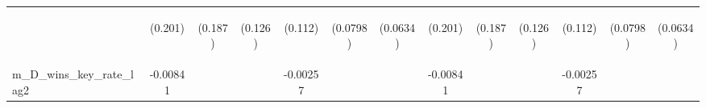 \documentclass[]{article}
\begin{document}
\begin{center}
\begin{tabular}{lcccccccccccc}
\vspace{4pt} & \begin{footnotesize}(0.201)\end{footnotesize} & \begin{footnotesize}(0.187)\end{footnotesize} & \begin{footnotesize}(0.126)\end{footnotesize} & \begin{footnotesize}(0.112)\end{footnotesize} & \begin{footnotesize}(0.0798)\end{footnotesize} & \begin{footnotesize}(0.0634)\end{footnotesize} & \begin{footnotesize}(0.201)\end{footnotesize} & \begin{footnotesize}(0.187)\end{footnotesize} & \begin{footnotesize}(0.126)\end{footnotesize} & \begin{footnotesize}(0.112)\end{footnotesize} & \begin{footnotesize}(0.0798)\end{footnotesize} & \begin{footnotesize}(0.0634)\end{footnotesize} \\
m\_D\_wins\_key\_rate\_lag2 & -0.00841 &  &  & -0.00257 &  &  & -0.00841 &  &  & -0.00257 &  &  \\

\end{tabular}
\end{center}
\end{document}
